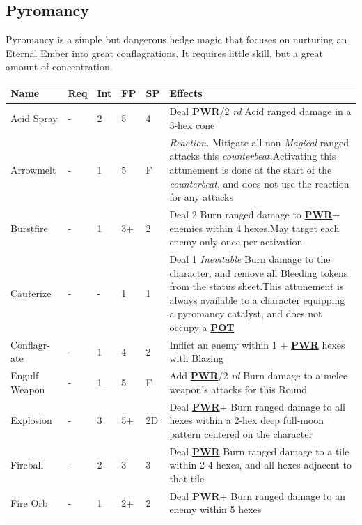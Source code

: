 \documentclass[12pt]{article}
\newcommand{\refto}[1]{\hyperlink{#1}{\textbf{#1}}}
\newcommand{\reftoit}[1]{\hyperlink{#1}{\emph{#1}}}
\begin{document}
\subsection{Pyromancy}
Pyromancy is a simple but dangerous hedge magic that focuses on nurturing an Eternal Ember into great conflagrations. It requires little skill, but a great amount of concentration.
\begin{center}
\begin{tabularx}{\textwidth}{p{}p{}p{}p{}p{}p{}}
\hline
\rowcolor{white} \textbf{Name} & \textbf{Req} & \textbf{Int} & \textbf{FP} & \textbf{SP} & \textbf{Effects}\setcounter{rownum}{0}\\
\hline
Acid Spray & - & 2 & 5 & 4 & Deal \refto{PWR}/2 \emph{rd} Acid ranged damage in a 3-hex cone\\ 
Arrowmelt & - & 1 & 5 & F & \emph{Reaction.} Mitigate all non-\emph{Magical} ranged attacks this \emph{counterbeat.}\newline Activating this attunement is done at the start of the \emph{counterbeat}, and does not use the reaction for any attacks\\
Burstfire & - & 1 & 3+ & 2 & Deal 2 Burn ranged damage to \refto{PWR}+ enemies within 4 hexes.\newline May target each enemy only once per activation \\
Cauterize & - & - & 1 & 1 & Deal 1 \reftoit{Inevitable} Burn damage to the character, and remove all Bleeding tokens from the status sheet.\newline This attunement is always available to a character equipping a pyromancy catalyst, and does not occupy a \refto{POT} \\
Conflagr-\newline ate & - & 1 & 4 & 2 & Inflict an enemy within 1 + \refto{PWR} hexes with Blazing\\
Engulf Weapon & - & 1 & 5 & F & Add \refto{PWR}/2 \emph{rd} Burn damage to a melee weapon’s attacks for this Round \\
Explosion & - & 3 & 5+ & 2D & Deal \refto{PWR}+ Burn ranged damage to all hexes within a 2-hex deep full-moon pattern centered on the character \\
Fireball & - & 2 & 3 & 3 & Deal \refto{PWR} Burn ranged damage to a tile within 2-4 hexes, and all hexes adjacent to that tile\\
Fire Orb & - & 1 & 2+ & 2 & Deal \refto{PWR}+ Burn ranged damage to an enemy within 5 hexes \\

\end{tabularx}
\end{center}
\end{document}
